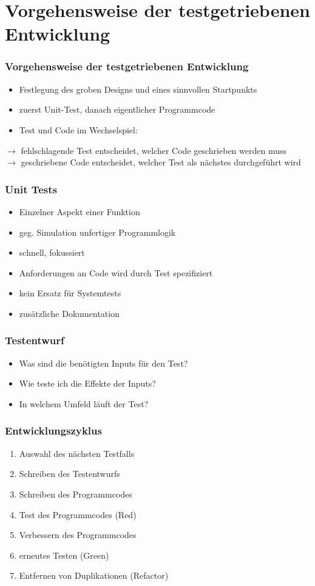 \documentclass{beamer}
\begin{document}
\section{Vorgehensweise der testgetriebenen Entwicklung}
\begin{frame}
\frametitle{Vorgehensweise der testgetriebenen Entwicklung}
\begin{itemize}
\item Festlegung des groben Designs und eines sinnvollen Startpunkts
\item zuerst Unit-Test, danach eigentlicher Programmcode
\item Test und Code im Wechselspiel:
\end{itemize}

$\rightarrow$ fehlschlagende Test entscheidet, welcher Code geschrieben werden muss\\
$\rightarrow$ geschriebene Code entscheidet, welcher Test als nächstes durchgeführt wird
\end{frame}

\begin{frame}
\frametitle{Unit Tests}
\begin{itemize}
\item Einzelner Aspekt einer Funktion
\item geg. Simulation unfertiger Programmlogik
\item schnell, fokussiert
\item Anforderungen an Code wird durch Test spezifiziert
\item kein Ersatz für Systemtests
\item zusätzliche Dokumentation
\end{itemize}
\end{frame}

\begin{frame}
\frametitle{Testentwurf}
\begin{itemize}
\item Was sind die benötigten Inputs für den Test? 
\item Wie teste ich die Effekte der Inputs?
\item In welchem Umfeld läuft der Test?
\end{itemize}
\end{frame}

\begin{frame}
\frametitle{Entwicklungszyklus}
\begin{enumerate}
\item Auswahl des nächsten Testfalls
\item Schreiben des Testentwurfs
\item Schreiben des Programmcodes
\item Test des Programmcodes (Red)
\item Verbessern des Programmcodes
\item erneutes Testen (Green)
\item Entfernen von Duplikationen (Refactor)
\end{enumerate}
\end{frame}
\end{document}
